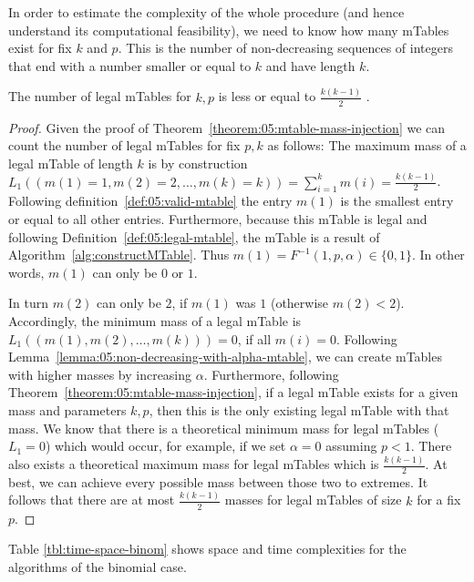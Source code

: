 In order to estimate the complexity of the whole procedure (and hence understand its computational feasibility), we need to know how many mTables exist for fix $k$ and $p$.
%
This is the number of non-decreasing sequences of integers that end with a number smaller or equal to $k$ and have length $k$.
%
\begin{theorem}
	\label{theorem:05:number-of-mtables}
	The number of legal mTables for $k,p$ is less or equal to $\frac{k(k-1)}{2}$ .
\end{theorem}

\begin{proof}
	\label{proof:05:number-of-mtables}
	Given the proof of Theorem~\ref{theorem:05:mtable-mass-injection} we can count the number of legal mTables for fix $p,k$ as follows: The maximum mass of a legal mTable of length $k$ is by construction
	$L_1 ((m(1) = 1,m(2) = 2, \ldots, m(k) = k)) = \sum_{i=1}^k m(i) = \frac{k(k-1)}{2}$. 
	Following definition~\ref{def:05:valid-mtable} the 	    entry $m(1)$ is the smallest entry or equal to all other entries. 
	Furthermore, because this mTable is legal and following Definition~\ref{def:05:legal-mtable}, the mTable is a result of Algorithm~\ref{alg:constructMTable}. 
	Thus $m(1) = F^{-1}(1,p,\alpha) \in \lbrace 0,1\rbrace$. In other words, $m(1)$ can only be $0$ or $1$.
	
	In turn $m(2)$ can only be $2$, if $m(1)$ was $1$ (otherwise $m(2)<2$).
	Accordingly, the minimum mass of a legal mTable is $L_1((m(1),m(2), \ldots, m(k))) = 0$, if all $m(i)=0$.
	Following Lemma~\ref{lemma:05:non-decreasing-with-alpha-mtable}, we can create mTables with higher masses by increasing $\alpha$. 
	Furthermore, following Theorem~\ref{theorem:05:mtable-mass-injection}, if a legal mTable exists for a given mass and parameters $k,p$, then this is the only existing legal mTable with that mass.
	We know that there is a theoretical minimum mass for legal mTables ($L_1 =0$) which would occur, for example, if we set $\alpha = 0$ assuming $p<1$.
	There also exists a theoretical maximum mass for legal mTables which is $\frac{k(k-1)}{2}$. 
	At best, we can achieve every possible mass between those two to extremes. 
	It follows that there are at most $\frac{k(k-1)}{2}$ masses for legal mTables of size $k$ for a fix~$p$.
\end{proof}
%
Table \ref{tbl:time-space-binom} shows space and time complexities for the algorithms of the binomial case. 
%
